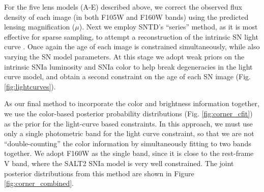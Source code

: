 \documentclass[12pt]{article}
\begin{document}
For the five lens models (A-E) described above, we correct the observed flux density of each image (in both F105W and F160W bands) using the predicted lensing magnification ($\mu$). Next we employ SNTD's ``series'' method, as it is most effective for sparse sampling, to attempt a reconstruction of the intrinsic SN light curve \cite{pierel_turning_2019}. Once again the age of each image is constrained simultaneously, while also varying the SN model parameters. At this stage we adopt weak priors on the intrinsic SNIa luminosity \cite{wang_determination_2006} and SNIa color \cite{mosher_cosmological_2014} to help break degeneracies in the light curve model, and obtain a second constraint on the age of each SN image (Fig. \ref{fig:lightcurves}). 



As our final method to incorporate the color and brightness information together, we use the color-based posterior probability distributions (Fig. \ref{fig:corner_cfit}) as the prior for 
the light-curve based constraints. In this approach, we must use only a single photometric band for the light curve constraint, so that we are not ``double-counting'' the color information by simultaneously fitting to two bands together.  We adopt F160W as the single band, since it is close to the rest-frame V band, where the SALT2 SNIa model is very well constrained.  The joint posterior distributions from this method are shown in Figure \ref{fig:corner_combined}.  
\end{document}
